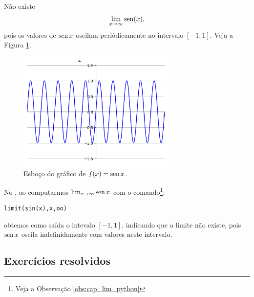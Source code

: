 \begin{ex}
  Não existe
  \begin{equation}
    \lim_{x\to \infty} \operatorname{sen}(x),
  \end{equation}
  pois os valores de $\operatorname{sen} x$ oscilam periódicamente no intervalo $[-1, 1]$. Veja a Figura \ref{fig:lim_senx_xinf}.

  \begin{figure}[H]
    \centering
    \includegraphics[width=0.7\textwidth]{./cap_lim/dados/fig_lim_senx_xinf/fig_lim_senx_xinf}
    \caption{Esboço do gráfico de $f(x)=\operatorname{sen} x$.}
    \label{fig:lim_senx_xinf}
  \end{figure}

  \ifispython
  No \sympy, ao computarmos $\lim_{x\to \infty} \operatorname{sen} x$ com o comando\footnote{Veja a Observação \ref{obs:cap_lim_python}}:
\begin{verbatim}
limit(sin(x),x,oo)
\end{verbatim}
  obtemos como saída o intevalo $[-1, 1]$, indicando que o limite não existe, pois $\operatorname{sen} x$ oscila indefinidamente com valores neste intervalo.
  \fi
\end{ex}


\subsection*{Exercícios resolvidos}


